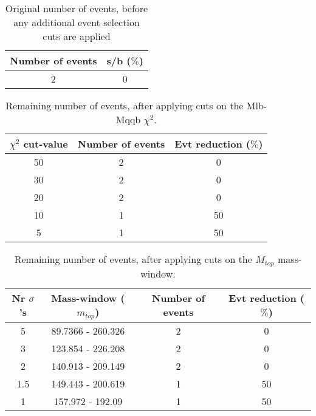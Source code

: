 \documentclass{article}
\begin{document}
 

 \begin{abstract} 
 
   The tables in this document represent the influence of the additional event selection cuts that were applied in order to reduce the number of selected events for CPU reasons. \\ 
   The considered cuts are rather basic and are merely developed to reduce the number of so-called wrong events \\ 
   \begin{itemize} 
     \item Cut on Mlb-Mqqb $\chi^{2}$ distribution 
     \item Cut on top and W-mass window 
   \end{itemize} 
 
   \textbf{Created on :} \today 
 \end{abstract} 
 
 \begin{table}[h!t] 
  \caption{Original number of events, before any additional event selection cuts are applied} 
  \centering 
   \begin{tabular}{c|c} 
     Number of events    & s/b ($\%$)     \\ 
     \hline
     2  & 0 
 
   \end{tabular} 
 \end{table} 
 
 \begin{table}[h!t] 
  \caption{Remaining number of events, after applying cuts on the Mlb-Mqqb $\chi^{2}$.} 
  \centering 
   \begin{tabular}{c|c|c|} 
     $\chi^{2}$ cut-value    & Number of events  & Evt reduction ($\%$)    \\ 
     \hline
     50  &   2  &  0 \\ 
     30  &   2  &  0 \\ 
     20  &   2  &  0 \\ 
     10  &   1  &  50 \\ 
     5  &   1  &  50 \\ 
   \end{tabular} 
 \end{table} 
 
 \begin{table}[h!t] 
  \caption{Remaining number of events, after applying cuts on the $M_{top}$ mass-window.} 
  \centering 
   \begin{tabular}{c|c|c|c|}
     Nr $\sigma$'s & Mass-window ($m_{top}$)   & Number of events   & Evt reduction ($\%$)     \\
     \hline
     5 & 89.7366 - 260.326  &   2 &  0 \\ 
     3 & 123.854 - 226.208  &   2 &  0 \\ 
     2 & 140.913 - 209.149  &   2 &  0 \\ 
     1.5 & 149.443 - 200.619  &   1 &  50 \\ 
     1 & 157.972 - 192.09  &   1 &  50 \\ 
   \end{tabular} 
 \end{table} 
 
\end{document}
